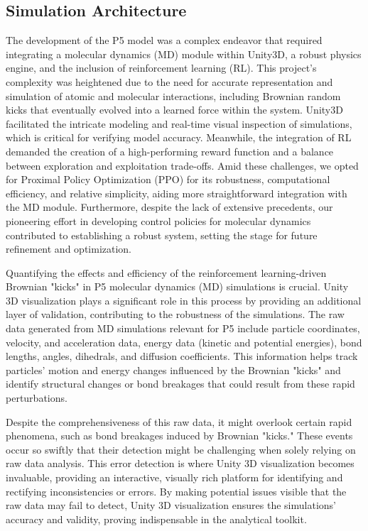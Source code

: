 \documentclass{article}
\theoremstyle{plain}
\theoremstyle{definition}
\theoremstyle{remark}
\begin{document}
\subsection{Simulation Architecture}
The development of the P5 model was a complex endeavor that required integrating a molecular dynamics (MD) module within Unity3D, a robust physics engine, and the inclusion of reinforcement learning (RL). This project's complexity was heightened due to the need for accurate representation and simulation of atomic and molecular interactions, including Brownian random kicks that eventually evolved into a learned force within the system. Unity3D facilitated the intricate modeling and real-time visual inspection of simulations, which is critical for verifying model accuracy. Meanwhile, the integration of RL demanded the creation of a high-performing reward function and a balance between exploration and exploitation trade-offs. Amid these challenges, we opted for Proximal Policy Optimization (PPO) for its robustness, computational efficiency, and relative simplicity, aiding more straightforward integration with the MD module. Furthermore, despite the lack of extensive precedents, our pioneering effort in developing control policies for molecular dynamics contributed to establishing a robust system, setting the stage for future refinement and optimization.

Quantifying the effects and efficiency of the reinforcement learning-driven Brownian "kicks" in P5 molecular dynamics (MD) simulations is crucial. Unity 3D visualization plays a significant role in this process by providing an additional layer of validation, contributing to the robustness of the simulations. The raw data generated from MD simulations relevant for P5 include particle coordinates, velocity, and acceleration data, energy data (kinetic and potential energies), bond lengths, angles, dihedrals, and diffusion coefficients. This information helps track particles' motion and energy changes influenced by the Brownian "kicks" and identify structural changes or bond breakages that could result from these rapid perturbations.

Despite the comprehensiveness of this raw data, it might overlook certain rapid phenomena, such as bond breakages induced by Brownian "kicks." These events occur so swiftly that their detection might be challenging when solely relying on raw data analysis. This error detection is where Unity 3D visualization becomes invaluable, providing an interactive, visually rich platform for identifying and rectifying inconsistencies or errors. By making potential issues visible that the raw data may fail to detect, Unity 3D visualization ensures the simulations' accuracy and validity, proving indispensable in the analytical toolkit.
\end{document}
